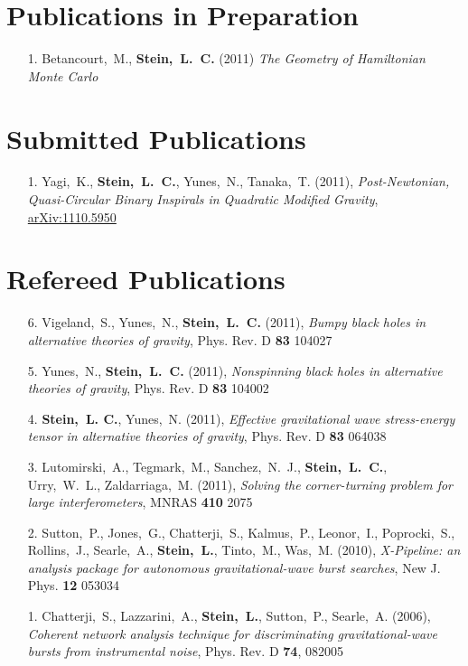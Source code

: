 \section{\sc Publications in Preparation}
\begin{enumerate}
\item[{1.}] Betancourt,~M., {\bf Stein,~L.~C.} (2011) {\it The Geometry of Hamiltonian Monte Carlo}
\end{enumerate}

\section{\sc Submitted Publications}
\begin{enumerate}
\item[{1.}] Yagi,~K., {\bf Stein,~L.~C.}, Yunes,~N.,
  Tanaka,~T. (2011), {\it Post-Newtonian, Quasi-Circular Binary
    Inspirals in Quadratic Modified Gravity}, \href{http://arxiv.org/abs/1110.5950}{arXiv:1110.5950}
\end{enumerate}

\section{\sc Refereed Publications}
\begin{enumerate}
\item[{6.}] Vigeland,~S., Yunes,~N., {\bf Stein,~L.~C.} (2011), {\it
    Bumpy black holes in alternative theories of gravity},
  Phys. Rev. D {\bf 83} 104027
\item[{5.}] Yunes,~N., {\bf Stein,~L.~C.} (2011), {\it Nonspinning
    black holes in alternative theories of gravity},
  Phys. Rev. D {\bf 83} 104002
\item[{4.}] {\bf Stein,~L. C.}, Yunes,~N. (2011), {\it Effective
    gravitational wave stress-energy tensor in alternative theories of
    gravity}, Phys. Rev. D {\bf 83} 064038
\item[{3.}] Lutomirski,~A., Tegmark,~M., Sanchez,~N.~J., {\bf
    Stein,~L.~C.},
  Urry,~W.~L., Zaldarriaga,~M. (2011), {\it Solving the
    corner-turning problem for large interferometers}, MNRAS {\bf 410} 2075
\item[{2.}] Sutton,~P., Jones,~G., Chatterji,~S., Kalmus,~P., Leonor,~I.,
  Poprocki,~S., Rollins,~J., Searle,~A., {\bf Stein,~L.}, Tinto,~M.,
  Was,~M. (2010), {\it X-Pipeline: an analysis package for autonomous
    gravitational-wave burst searches}, New J. Phys. {\bf 12} 053034
\item[{1.}] Chatterji,~S., Lazzarini,~A., {\bf Stein,~L.}, Sutton,~P.,
  Searle,~A. (2006), {\it Coherent network analysis technique for
    discriminating gravitational-wave bursts from instrumental noise},
  Phys. Rev. D {\bf 74}, 082005
\end{enumerate}

